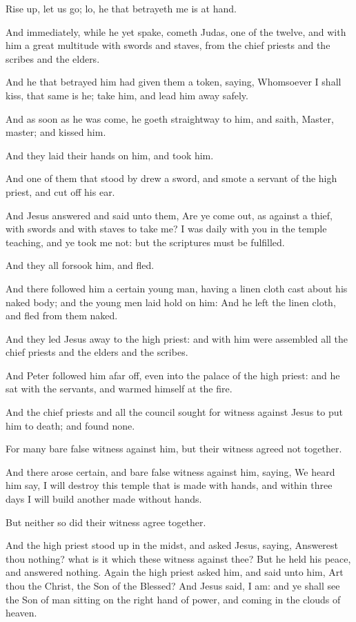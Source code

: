 \verse Rise up, let us go; lo, he that betrayeth me is at hand.

\verse And immediately, while he yet spake, cometh Judas, one of the twelve, and with him a great multitude with swords and staves, from the chief priests and the scribes and the elders.

\verse And he that betrayed him had given them a token, saying, Whomsoever I shall kiss, that same is he; take him, and lead him away safely.

\verse And as soon as he was come, he goeth straightway to him, and saith, Master, master; and kissed him.

\verse And they laid their hands on him, and took him.

\verse And one of them that stood by drew a sword, and smote a servant of the high priest, and cut off his ear.

\verse And Jesus answered and said unto them, Are ye come out, as against a thief, with swords and with staves to take me?  \verse I was daily with you in the temple teaching, and ye took me not: but the scriptures must be fulfilled.

\verse And they all forsook him, and fled.

\verse And there followed him a certain young man, having a linen cloth cast about his naked body; and the young men laid hold on him: \verse And he left the linen cloth, and fled from them naked.

\verse And they led Jesus away to the high priest: and with him were assembled all the chief priests and the elders and the scribes.

\verse And Peter followed him afar off, even into the palace of the high priest: and he sat with the servants, and warmed himself at the fire.

\verse And the chief priests and all the council sought for witness against Jesus to put him to death; and found none.

\verse For many bare false witness against him, but their witness agreed not together.

\verse And there arose certain, and bare false witness against him, saying, \verse We heard him say, I will destroy this temple that is made with hands, and within three days I will build another made without hands.

\verse But neither so did their witness agree together.

\verse And the high priest stood up in the midst, and asked Jesus, saying, Answerest thou nothing? what is it which these witness against thee?  \verse But he held his peace, and answered nothing. Again the high priest asked him, and said unto him, Art thou the Christ, the Son of the Blessed?  \verse And Jesus said, I am: and ye shall see the Son of man sitting on the right hand of power, and coming in the clouds of heaven.

